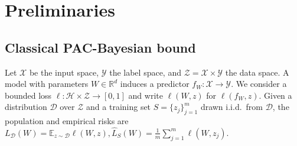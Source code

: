 \documentclass{article}
\theoremstyle{plain}
\theoremstyle{definition}
\theoremstyle{remark}
\begin{document}







\section{Preliminaries}










\subsection{Classical PAC-Bayesian bound}
Let $\mathcal X$ be the input space, $\mathcal Y$ the label space, and $\mathcal Z = \mathcal X \times \mathcal Y$ the data space.
A model with parameters $W \in \mathbb R^d$ induces a predictor $f_W : \mathcal X \to \mathcal Y$.
We consider a bounded loss $\ell : \mathcal H \times \mathcal Z \to [0,1]$ and write $\ell(W,z)$ for $\ell(f_W,z)$. 
Given a distribution $\mathcal D$ over $\mathcal Z$ and a training set $S=\{z_j\}_{j=1}^m$ drawn i.i.d.\ from $\mathcal D$, the population and empirical risks are
$
L_{\mathcal D}(W)
=
\mathbb E_{z\sim\mathcal D}\ell(W,z),
\hat L_{S}(W)
=
\frac{1}{m}\sum_{j=1}^{m}\ell(W,z_{j}).
$
\end{document}
